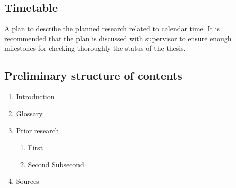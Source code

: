 \documentclass[a4paper,12pt]{article}
\begin{document}
\begin{appendices}
	\subsection*{Timetable }
	A plan to describe the planned research related to calendar time. It is recommended that 
	the  plan  is  discussed  with  supervisor  to  ensure  enough  milestones  for  checking 
	thoroughly the status of the thesis.
	
	\subsection*{Preliminary structure of contents }
	\begin{enumerate}
		\item Introduction
		\item Glossary
		\item Prior research
		\begin{enumerate} 
			\item First
			\item Second
			\subitem Subsecond
		\end{enumerate}		
		\item Sources
	\end{enumerate}
	
\end{appendices}
\end{document}
